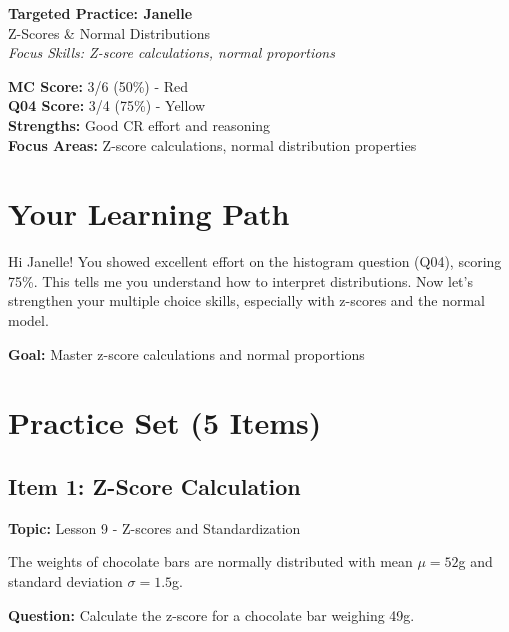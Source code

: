 \documentclass[11pt]{article}
\begin{document}
\begin{center}
{\LARGE \textbf{Targeted Practice: Janelle}}\\[0.05in]
{\large Z-Scores \& Normal Distributions}\\[0.05in]
\textit{Focus Skills: Z-score calculations, normal proportions}
\end{center}

\vspace{0.15in}

\begin{tcolorbox}[colback=yellow!10!white,colframe=orange!75!black,title=\textbf{Performance Summary}]
\textbf{MC Score:} 3/6 (50\%) - Red\\
\textbf{Q04 Score:} 3/4 (75\%) - Yellow\\
\textbf{Strengths:} Good CR effort and reasoning\\
\textbf{Focus Areas:} Z-score calculations, normal distribution properties
\end{tcolorbox}

\vspace{0.15in}

\section*{Your Learning Path}

Hi Janelle! You showed excellent effort on the histogram question (Q04), scoring 75\%. This tells me you understand how to interpret distributions. Now let's strengthen your multiple choice skills, especially with z-scores and the normal model.

\textbf{Goal:} Master z-score calculations and normal proportions

\vspace{0.15in}

\section*{Practice Set (5 Items)}

\subsection*{Item 1: Z-Score Calculation}
\textbf{Topic:} Lesson 9 - Z-scores and Standardization

The weights of chocolate bars are normally distributed with mean $\mu = 52$g and standard deviation $\sigma = 1.5$g.

\textbf{Question:} Calculate the z-score for a chocolate bar weighing 49g.
\end{document}
